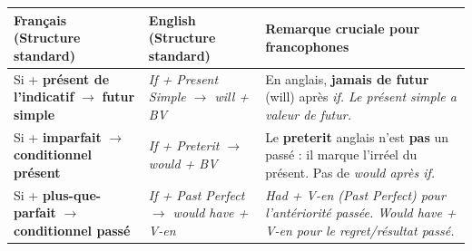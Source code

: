 \documentclass[11pt]{article}
\newcommand{\eng}[1]{\ifmmode\text{\textit{#1}}\else\begingroup\selectlanguage{english}\itshape #1\endgroup\fi}
\begin{document}
\begin{propriete}
\centering
\begin{tabularx}{\linewidth}{|X|X|X|}
\hline
\rowcolor{popblueL} \textbf{Français (Structure standard)} & \textbf{English (Structure standard)} & \textbf{Remarque cruciale pour francophones} \\
\hline
Si + \textbf{présent de l'indicatif} $\rightarrow$ \textbf{futur simple} & \eng{If + Present Simple $\rightarrow$ will + BV} & En anglais, \textbf{jamais de futur} (will) après \eng{if}. Le présent simple a valeur de futur. \\
\hline
Si + \textbf{imparfait} $\rightarrow$ \textbf{conditionnel présent} & \eng{If + Preterit $\rightarrow$ would + BV} & Le \textbf{preterit} anglais n'est \textbf{pas} un passé : il marque l'irréel du présent. Pas de \eng{would} après \eng{if}. \\
\hline
Si + \textbf{plus-que-parfait} $\rightarrow$ \textbf{conditionnel passé} & \eng{If + Past Perfect $\rightarrow$ would have + V-en} & \eng{Had + V-en} (Past Perfect) pour l'antériorité passée. \eng{Would have + V-en} pour le regret/résultat passé. \\
\hline
\end{tabularx}
\end{propriete}
\end{document}
